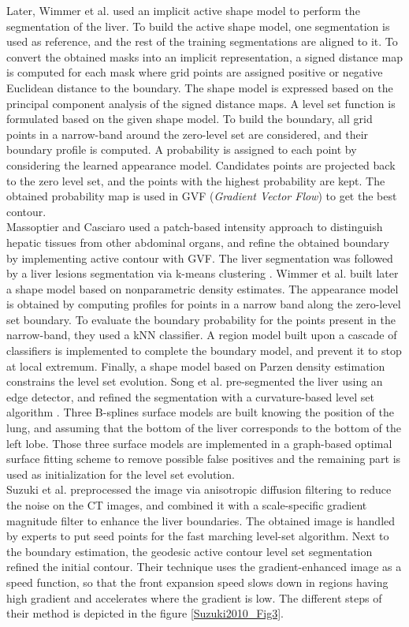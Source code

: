 Later, Wimmer et al. \cite{Wimmer2008} used an implicit active shape model to perform the
segmentation of the liver. To build the active shape model, one
segmentation is used as reference, and the rest of the training
segmentations are aligned to it. To convert the obtained masks into an
implicit representation, a signed distance map is computed for each mask
where grid points are assigned positive or negative Euclidean distance
to the boundary. The shape model is expressed based on the principal
component analysis of the signed distance maps. A level set function is
formulated based on the given shape model. To build the boundary, all
grid points in a narrow-band around the zero-level set are considered,
and their boundary profile is computed. A probability is assigned to
each point by considering the learned appearance model. Candidates
points are projected back to the zero level set, and the points with the
highest probability are kept. The obtained probability map is used in
GVF (\emph{Gradient Vector Flow}) to get the best contour.\\
Massoptier and Casciaro used a patch-based intensity approach to distinguish
hepatic tissues from other abdominal organs, and refine the obtained
boundary by implementing active contour with GVF. The liver segmentation
was followed by a liver lesions segmentation via k-means clustering \cite{Massoptier2008}. Wimmer et al. \cite{Wimmer2009} built later a shape model based on nonparametric density
estimates. The appearance model is obtained by computing profiles for
points in a narrow band along the zero-level set boundary. To evaluate
the boundary probability for the points present in the narrow-band, they
used a kNN classifier. A region model built upon a cascade of
classifiers is implemented to complete the boundary model, and prevent
it to stop at local extremum. Finally, a shape model based on Parzen
density estimation constrains the level set evolution. Song et al. \cite{Song2009} pre-segmented the liver using an edge detector, and
refined the segmentation with a curvature-based level set algorithm .
Three B-splines surface models are built knowing the position of the
lung, and assuming that the bottom of the liver corresponds to the
bottom of the left lobe. Those three surface models are implemented in a
graph-based optimal surface fitting scheme to remove possible false
positives and the remaining part is used as initialization for the level
set evolution.\\
Suzuki et al. \cite{Suzuki2010} preprocessed the image via anisotropic diffusion
filtering to reduce the noise on the CT images, and combined it with a
scale-specific gradient magnitude filter to enhance the liver
boundaries. The obtained image is handled by experts to put seed points
for the fast marching level-set algorithm. Next to the boundary
estimation, the geodesic active contour level set segmentation refined
the initial contour. Their technique uses the gradient-enhanced image as
a speed function, so that the front expansion speed slows down in
regions having high gradient and accelerates where the gradient is low.
The different steps of their method is depicted in the figure \ref{Suzuki2010_Fig3}.

